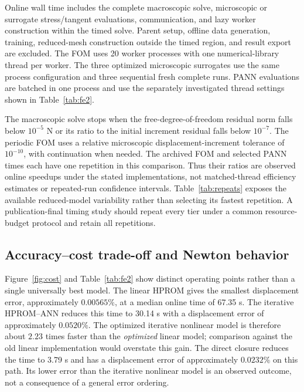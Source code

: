 \documentclass[10pt,a4paper]{article}
\begin{document}
Online wall time includes the complete macroscopic solve, microscopic or surrogate stress/tangent evaluations, communication, and lazy worker construction within the timed solve. Parent setup, offline data generation, training, reduced-mesh construction outside the timed region, and result export are excluded. The FOM uses 20 worker processes with one numerical-library thread per worker. The three optimized microscopic surrogates use the same process configuration and three sequential fresh complete runs. PANN evaluations are batched in one process and use the separately investigated thread settings shown in Table~\ref{tab:fe2}.

The macroscopic solve stops when the free-degree-of-freedom residual norm falls below $10^{-5}$ N or its ratio to the initial increment residual falls below $10^{-7}$. The periodic FOM uses a relative microscopic displacement-increment tolerance of $10^{-10}$, with continuation when needed. The archived FOM and selected PANN times each have one repetition in this comparison. Thus their ratios are observed online speedups under the stated implementations, not matched-thread efficiency estimates or repeated-run confidence intervals. Table~\ref{tab:repeats} exposes the available reduced-model variability rather than selecting its fastest repetition. A publication-final timing study should repeat every tier under a common resource-budget protocol and retain all repetitions.

\begin{table}[htbp]
 \centering\footnotesize
 \caption{Complete coupon simulations: final-field errors against the nested FOM and archived online wall times.}
 \label{tab:fe2}
 
\end{table}
\begin{table}[htbp]
 \centering\small
 \caption{Sequential optimized-run repetitions used for median HPROM timings.}
 \label{tab:repeats}
 
\end{table}

\subsection{Accuracy--cost trade-off and Newton behavior}
Figure~\ref{fig:cost} and Table~\ref{tab:fe2} show distinct operating points rather than a single universally best model. The linear HPROM gives the smallest displacement error, approximately $0.00565\%$, at a median online time of 67.35 s. The iterative HPROM--ANN reduces this time to 30.14 s with a displacement error of approximately $0.0520\%$. The optimized iterative nonlinear model is therefore about $2.23$ times faster than the \emph{optimized} linear model; comparison against the old linear implementation would overstate this gain. The direct closure reduces the time to 3.79 s and has a displacement error of approximately $0.0232\%$ on this path. Its lower error than the iterative nonlinear model is an observed outcome, not a consequence of a general error ordering.
\end{document}

